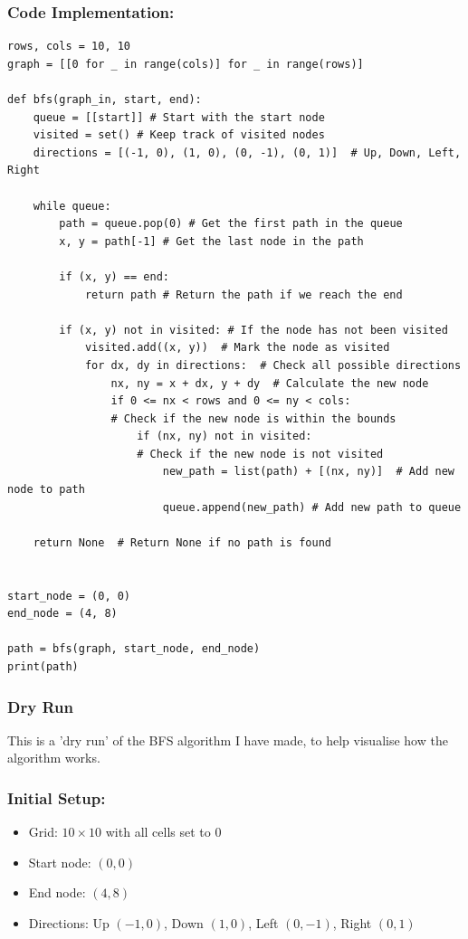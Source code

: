 \newpage

\subsubsection{Code Implementation:}
\begin{verbatim}
rows, cols = 10, 10
graph = [[0 for _ in range(cols)] for _ in range(rows)]

def bfs(graph_in, start, end):
    queue = [[start]] # Start with the start node
    visited = set() # Keep track of visited nodes
    directions = [(-1, 0), (1, 0), (0, -1), (0, 1)]  # Up, Down, Left, Right

    while queue:
        path = queue.pop(0) # Get the first path in the queue
        x, y = path[-1] # Get the last node in the path

        if (x, y) == end:
            return path # Return the path if we reach the end

        if (x, y) not in visited: # If the node has not been visited
            visited.add((x, y))  # Mark the node as visited
            for dx, dy in directions:  # Check all possible directions
                nx, ny = x + dx, y + dy  # Calculate the new node
                if 0 <= nx < rows and 0 <= ny < cols:  
                # Check if the new node is within the bounds
                    if (nx, ny) not in visited: 
                    # Check if the new node is not visited
                        new_path = list(path) + [(nx, ny)]  # Add new node to path
                        queue.append(new_path) # Add new path to queue

    return None  # Return None if no path is found


start_node = (0, 0)
end_node = (4, 8)

path = bfs(graph, start_node, end_node)
print(path)

\end{verbatim}

\newpage

\subsubsection{Dry Run}
This is a 'dry run' of the BFS algorithm I have made, to help visualise how the algorithm works.

\subsubsection{Initial Setup:}
\begin{itemize}
    \item Grid: $10 \times 10$ with all cells set to 0
    \item Start node: $(0,0)$
    \item End node: $(4,8)$
    \item Directions: Up $(-1,0)$, Down $(1,0)$, Left $(0,-1)$, Right $(0,1)$
\end{itemize}

